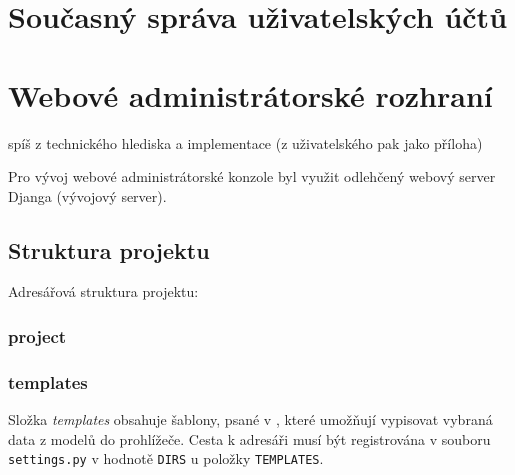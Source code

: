 \section{Současný správa uživatelských účtů}
\label{cmd-line}


\section{Webové administrátorské rozhraní}
spíš z technického hlediska a implementace
(z uživatelského pak jako příloha)

Pro vývoj webové administrátorské konzole byl využit odlehčený webový server Djanga (vývojový server).

\subsection{Struktura projektu}
Adresářová struktura projektu:


\subsubsection{project}

\subsubsection{templates}
Složka \textit{templates} obsahuje šablony, psané v , které umožňují vypisovat vybraná data z modelů do prohlížeče. Cesta k adresáři musí být registrována v souboru \texttt{settings.py} v hodnotě \texttt{DIRS} u položky \texttt{TEMPLATES}.

